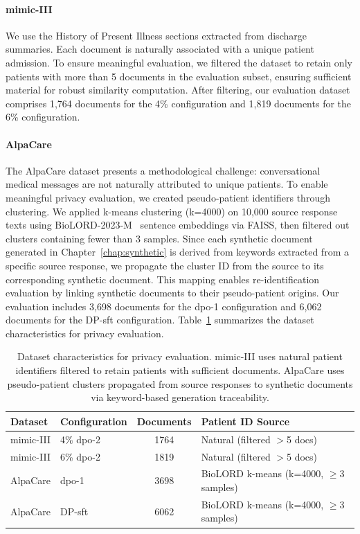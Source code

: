 \paragraph{\gls{mimic}-III} We use the History of Present Illness sections extracted from discharge summaries. Each document is naturally associated with a unique patient admission. To ensure meaningful evaluation, we filtered the dataset to retain only patients with more than 5 documents in the evaluation subset, ensuring sufficient material for robust similarity computation. After filtering, our evaluation dataset comprises 1,764 documents for the 4\% configuration and 1,819 documents for the 6\% configuration.

\paragraph{AlpaCare} The AlpaCare dataset presents a methodological challenge: conversational medical messages are not naturally attributed to unique patients. To enable meaningful privacy evaluation, we created pseudo-patient identifiers through clustering. We applied k-means clustering (k=4000) on 10,000 source response texts using BioLORD-2023-M~\cite{remy2024biolord} sentence embeddings via FAISS, then filtered out clusters containing fewer than 3 samples. Since each synthetic document generated in Chapter~\ref{chap:synthetic} is derived from keywords extracted from a specific source response, we propagate the cluster ID from the source to its corresponding synthetic document. This mapping enables re-identification evaluation by linking synthetic documents to their pseudo-patient origins. Our evaluation includes 3,698 documents for the \gls{dpo}-1 configuration and 6,062 documents for the DP-\gls{sft} configuration. Table~\ref{tab:privacy_datasets} summarizes the dataset characteristics for privacy evaluation.

\begin{table}[h]
\centering
\begin{tabular}{llcl}
\toprule
\textbf{Dataset} & \textbf{Configuration} & \textbf{Documents} & \textbf{Patient ID Source} \\
\midrule
\gls{mimic}-III & 4\% \gls{dpo}-2 & \num{1764} & Natural (filtered $>$5 docs) \\
\gls{mimic}-III & 6\% \gls{dpo}-2 & \num{1819} & Natural (filtered $>$5 docs) \\
AlpaCare & \gls{dpo}-1 & \num{3698} & BioLORD k-means (k=\num{4000}, $\geq$3 samples) \\
AlpaCare & DP-\gls{sft} & \num{6062} & BioLORD k-means (k=\num{4000}, $\geq$3 samples) \\
\bottomrule
\end{tabular}
\caption{Dataset characteristics for privacy evaluation. \gls{mimic}-III uses natural patient identifiers filtered to retain patients with sufficient documents. AlpaCare uses pseudo-patient clusters propagated from source responses to synthetic documents via keyword-based generation traceability.}
\label{tab:privacy_datasets}
\end{table}


